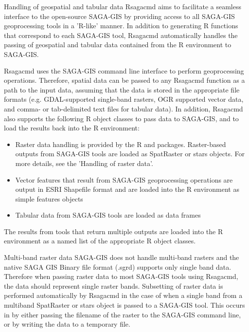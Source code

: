 \documentclass[a4paper]{book}
\begin{document}
\begin{Section}{Handling of geospatial and tabular data}
Rsagacmd aims to facilitate
a seamless interface to the open-source SAGA-GIS by providing access to all
SAGA-GIS geoprocessing tools in a 'R-like' manner. In addition to
generating R functions that correspond to each SAGA-GIS tool, Rsagacmd
automatically handles the passing of geospatial and tabular data contained
from the R environment to SAGA-GIS.

Rsagacmd uses the SAGA-GIS command line interface to perform geoprocessing
operations. Therefore, spatial data can be passed to any Rsagacmd function as
a path to the input data, assuming that the data is stored in the appropriate
file formats (e.g. GDAL-supported single-band rasters, OGR supported vector
data, and comma- or tab-delimited text files for tabular data). In addition,
Rsagacmd also supports the following R object classes to pass data to
SAGA-GIS, and to load the results back into the R environment:
\begin{itemize}

\item{} Raster data handling is provided by the R  and 
packages. Raster-based outputs from SAGA-GIS tools are loaded as SpatRaster
or stars objects. For more details, see the 'Handling of raster data'.
\item{} Vector features that result from SAGA-GIS geoprocessing operations are
output in ESRI Shapefile format and are loaded into the R environment as
simple features objects
\item{} Tabular data from SAGA-GIS tools are loaded as data frames

\end{itemize}

The results from tools that return multiple outputs are loaded into the R
environment as a named list of the appropriate R object classes.
\end{Section}
%
\begin{Section}{Multi-band raster data}
SAGA-GIS does not handle multi-band rasters
and the native SAGA GIS Binary file format (.sgrd) supports only single
band data. Therefore when passing raster data to most SAGA-GIS tools using
Rsagacmd, the data should represent single raster bands. Subsetting of
raster data is performed automatically by Rsagacmd in the case of when a
single band from a multiband SpatRaster or stars object is passed to a
SAGA-GIS tool. This occurs in by either passing the filename of the raster
to the SAGA-GIS command line, or by writing the data to a temporary file.
\end{Section}
\end{document}
